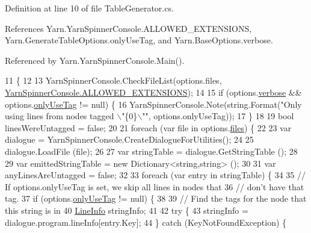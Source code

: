 Definition at line 10 of file Table\-Generator.\-cs.



References Yarn.\-Yarn\-Spinner\-Console.\-A\-L\-L\-O\-W\-E\-D\-\_\-\-E\-X\-T\-E\-N\-S\-I\-O\-N\-S, Yarn.\-Generate\-Table\-Options.\-only\-Use\-Tag, and Yarn.\-Base\-Options.\-verbose.



Referenced by Yarn.\-Yarn\-Spinner\-Console.\-Main().


\begin{DoxyCode}
11         \{
12 
13             YarnSpinnerConsole.CheckFileList(options.files, 
      \hyperlink{a00185_a0979de7ea02c8c0375b8220a12e6575e}{YarnSpinnerConsole.ALLOWED\_EXTENSIONS});
14 
15             \textcolor{keywordflow}{if} (options.\hyperlink{a00031_ada4d83d1756918f362d55f6649b82b17}{verbose} && options.\hyperlink{a00097_a8b30c1b7fb1b74eae455a568c1024b3d}{onlyUseTag} != null) \{
16                 YarnSpinnerConsole.Note(string.Format(\textcolor{stringliteral}{"Only using lines from nodes tagged \(\backslash\)"\{0\}\(\backslash\)""}, 
      options.onlyUseTag));
17             \}
18 
19             \textcolor{keywordtype}{bool} linesWereUntagged = \textcolor{keyword}{false};
20 
21             \textcolor{keywordflow}{foreach} (var file \textcolor{keywordflow}{in} options.\hyperlink{a00031_aa93cbb1bc1d5328e0a417012621e92d2}{files}) \{
22 
23                 var dialogue = YarnSpinnerConsole.CreateDialogueForUtilities();
24 
25                 dialogue.LoadFile (file);
26 
27                 var stringTable = dialogue.GetStringTable ();
28 
29                 var emittedStringTable = \textcolor{keyword}{new} Dictionary<string,string> ();
30 
31                 var anyLinesAreUntagged = \textcolor{keyword}{false};
32 
33                 \textcolor{keywordflow}{foreach} (var entry \textcolor{keywordflow}{in} stringTable) \{
34 
35                     \textcolor{comment}{// If options.onlyUseTag is set, we skip all lines in nodes that}
36                     \textcolor{comment}{// don't have that tag.}
37                     \textcolor{keywordflow}{if} (options.\hyperlink{a00097_a8b30c1b7fb1b74eae455a568c1024b3d}{onlyUseTag} != null) \{
38 
39                         \textcolor{comment}{// Find the tags for the node that this string is in}
40                         \hyperlink{a00121}{LineInfo} stringInfo;
41 
42                         \textcolor{keywordflow}{try} \{
43                             stringInfo = dialogue.program.lineInfo[entry.Key];
44                         \} \textcolor{keywordflow}{catch} (KeyNotFoundException) \{

\end{DoxyCode}
